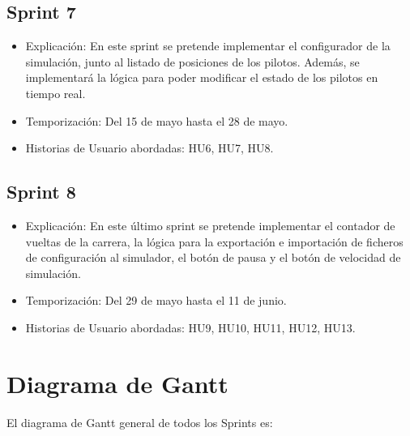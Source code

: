 \subsection{Sprint 7}

\begin{itemize}
    \item Explicación: En este sprint se pretende implementar el configurador de la simulación, junto al listado de posiciones de los pilotos. Además, se implementará la lógica para poder modificar el estado de los pilotos en tiempo real.
    
    
    
    \item Temporización: Del 15 de mayo hasta el 28 de mayo.
    \item Historias de Usuario abordadas: HU6, HU7, HU8.
\end{itemize}

\subsection{Sprint 8}

\begin{itemize}
    \item Explicación: En este último sprint se pretende implementar el contador de vueltas de la carrera, la lógica para la exportación e importación de ficheros de configuración al simulador, el botón de pausa y el botón de velocidad de simulación.
    \item Temporización: Del 29 de mayo hasta el 11 de junio.
    \item Historias de Usuario abordadas: HU9, HU10, HU11, HU12, HU13.
\end{itemize}



\newpage
\section{Diagrama de Gantt}

El diagrama de Gantt general de todos los Sprints es:


